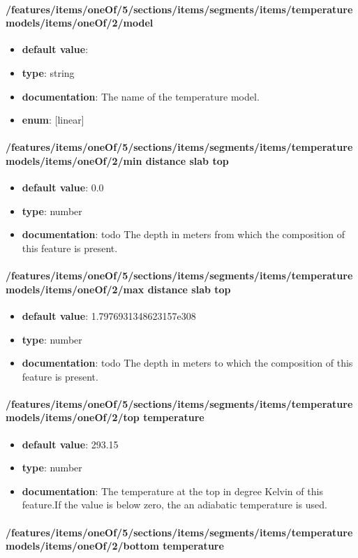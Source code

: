 \paragraph{/features/items/oneOf/5/sections/items/segments/items/temperature models/items/oneOf/2/model}
\begin{itemize}\item {\bf default value}: 
\item {\bf type}: string
\item {\bf documentation}: The name of the temperature model.
\item {\bf enum}: [linear]\end{itemize}\paragraph{/features/items/oneOf/5/sections/items/segments/items/temperature models/items/oneOf/2/min distance slab top}
\begin{itemize}\item {\bf default value}: 0.0
\item {\bf type}: number
\item {\bf documentation}: todo The depth in meters from which the composition of this feature is present.
\end{itemize}\paragraph{/features/items/oneOf/5/sections/items/segments/items/temperature models/items/oneOf/2/max distance slab top}
\begin{itemize}\item {\bf default value}: 1.7976931348623157e308
\item {\bf type}: number
\item {\bf documentation}: todo The depth in meters to which the composition of this feature is present.
\end{itemize}\paragraph{/features/items/oneOf/5/sections/items/segments/items/temperature models/items/oneOf/2/top temperature}
\begin{itemize}\item {\bf default value}: 293.15
\item {\bf type}: number
\item {\bf documentation}: The temperature at the top in degree Kelvin of this feature.If the value is below zero, the an adiabatic temperature is used.
\end{itemize}\paragraph{/features/items/oneOf/5/sections/items/segments/items/temperature models/items/oneOf/2/bottom temperature}
